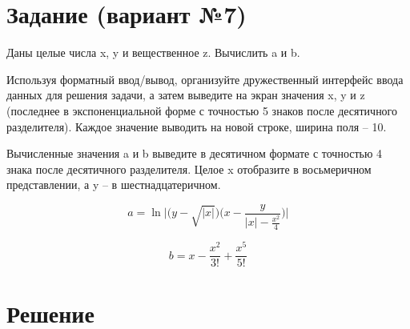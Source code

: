 \documentclass[12pt]{article}
\begin{document}
\section*{Задание (вариант №7)}
Даны целые числа x, y и вещественное z. Вычислить a и b.


Используя форматный ввод/вывод, организуйте дружественный интерфейс ввода данных
для решения задачи, а затем выведите на экран значения x, y и z (последнее в экспоненциальной форме с точностью 5 знаков после десятичного разделителя). Каждое значение выводить на новой строке, ширина поля – 10.


Вычисленные значения a и b выведите в десятичном формате с точностью 4 знака после
десятичного разделителя. Целое x отобразите в восьмеричном представлении, а y – в
шестнадцатеричном.

$$a = 
\ln \Bigg| \biggl(y-\sqrt{|x|} \biggr) \biggl(x - \frac{y}{|x| - \frac{x^2}{4}} \biggr) \Bigg|
$$

$$
b = 
x - \frac{x^2}{3!} + \frac{x^5}{5!}
$$

\newpage


\section*{Решение}

\end{document}
